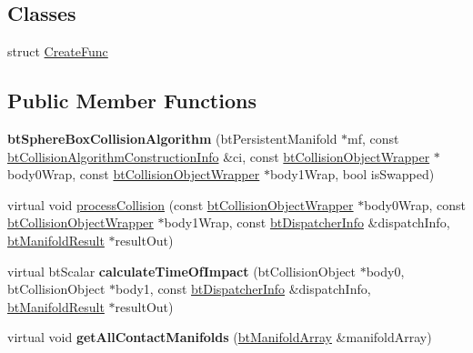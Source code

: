 \subsection*{Classes}
\begin{DoxyCompactItemize}
\item 
struct \hyperlink{structbtSphereBoxCollisionAlgorithm_1_1CreateFunc}{Create\+Func}
\end{DoxyCompactItemize}
\subsection*{Public Member Functions}
\begin{DoxyCompactItemize}
\item 
\mbox{\label{classbtSphereBoxCollisionAlgorithm_a0d289a90663e6b7a7863ba6530c3de78}} 
{\bfseries bt\+Sphere\+Box\+Collision\+Algorithm} (bt\+Persistent\+Manifold $\ast$mf, const \hyperlink{structbtCollisionAlgorithmConstructionInfo}{bt\+Collision\+Algorithm\+Construction\+Info} \&ci, const \hyperlink{structbtCollisionObjectWrapper}{bt\+Collision\+Object\+Wrapper} $\ast$body0\+Wrap, const \hyperlink{structbtCollisionObjectWrapper}{bt\+Collision\+Object\+Wrapper} $\ast$body1\+Wrap, bool is\+Swapped)
\item 
virtual void \hyperlink{classbtSphereBoxCollisionAlgorithm_ab171b2afeabaaaa8a51728426643c369}{process\+Collision} (const \hyperlink{structbtCollisionObjectWrapper}{bt\+Collision\+Object\+Wrapper} $\ast$body0\+Wrap, const \hyperlink{structbtCollisionObjectWrapper}{bt\+Collision\+Object\+Wrapper} $\ast$body1\+Wrap, const \hyperlink{structbtDispatcherInfo}{bt\+Dispatcher\+Info} \&dispatch\+Info, \hyperlink{classbtManifoldResult}{bt\+Manifold\+Result} $\ast$result\+Out)
\item 
\mbox{\label{classbtSphereBoxCollisionAlgorithm_adb1982e2585bfcf69dadc4d6b2305fa4}} 
virtual bt\+Scalar {\bfseries calculate\+Time\+Of\+Impact} (bt\+Collision\+Object $\ast$body0, bt\+Collision\+Object $\ast$body1, const \hyperlink{structbtDispatcherInfo}{bt\+Dispatcher\+Info} \&dispatch\+Info, \hyperlink{classbtManifoldResult}{bt\+Manifold\+Result} $\ast$result\+Out)
\item 
\mbox{\label{classbtSphereBoxCollisionAlgorithm_ac506db81f3885ed079b902817a6d7803}} 
virtual void {\bfseries get\+All\+Contact\+Manifolds} (\hyperlink{classbtAlignedObjectArray}{bt\+Manifold\+Array} \&manifold\+Array)

\end{DoxyCompactItemize}
